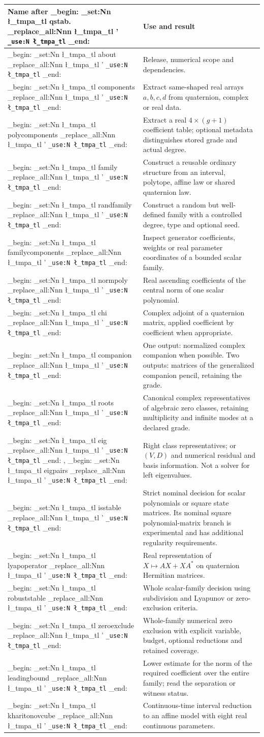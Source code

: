 \documentclass[11pt,a4paper]{article}
\newcommand{\m}[1]{
  \group_begin:
  \tl_set:Nn \l_tmpa_tl {#1}
  \tl_replace_all:Nnn \l_tmpa_tl {'}{\textquotesingle{}}
  \texttt{\tl_use:N \l_tmpa_tl}
  \group_end:
}
\begin{document}
\par\smallskip\noindent\begin{tabularx}{\linewidth}{@{}>{\raggedright\arraybackslash}p{.30\linewidth}Y@{}}\toprule
Name after \m{qstab.} & Use and result\\\midrule
\m{about} & Release, numerical scope and dependencies.\\
\m{components} & Extract same-shaped real arrays $a,b,c,d$ from quaternion, complex or real data.\\
\m{polycomponents} & Extract a real $4\times(g+1)$ coefficient table; optional metadata distinguishes stored grade and actual degree.\\
\m{family} & Construct a reusable ordinary structure from an interval, polytope, affine law or shared quaternion law.\\
\m{randfamily} & Construct a random but well-defined family with a controlled degree, type and optional seed.\\
\m{familycomponents} & Inspect generator coefficients, weights or real parameter coordinates of a bounded scalar family.\\
\m{normpoly} & Real ascending coefficients of the central norm of one scalar polynomial.\\
\m{chi} & Complex adjoint of a quaternion matrix, applied coefficient by coefficient when appropriate.\\
\m{companion} & One output: normalized complex companion when possible. Two outputs: matrices of the generalized companion pencil, retaining the grade.\\
\m{roots} & Canonical complex representatives of algebraic zero classes, retaining multiplicity and infinite modes at a declared grade.\\
\m{eig}, \m{eigpairs} & Right class representatives; or $(V,D)$ and numerical residual and basis information. Not a solver for left eigenvalues.\\
\m{isstable} & Strict nominal decision for scalar polynomials or square state matrices. Its nominal square polynomial-matrix branch is experimental and has additional regularity requirements.\\
\m{lyapoperator} & Real representation of $X\mapsto AX+XA^*$ on quaternion Hermitian matrices.\\
\m{robuststable} & Whole scalar-family decision using subdivision and Lyapunov or zero-exclusion criteria.\\
\m{zeroexclude} & Whole-family numerical zero exclusion with explicit variable, budget, optional reductions and retained coverage.\\
\m{leadingbound} & Lower estimate for the norm of the required coefficient over the entire family; read the separation or witness status.\\
\m{kharitonovcube} & Continuous-time interval reduction to an affine model with eight real continuous parameters.\\\bottomrule
\end{tabularx}\par\smallskip
\end{document}
